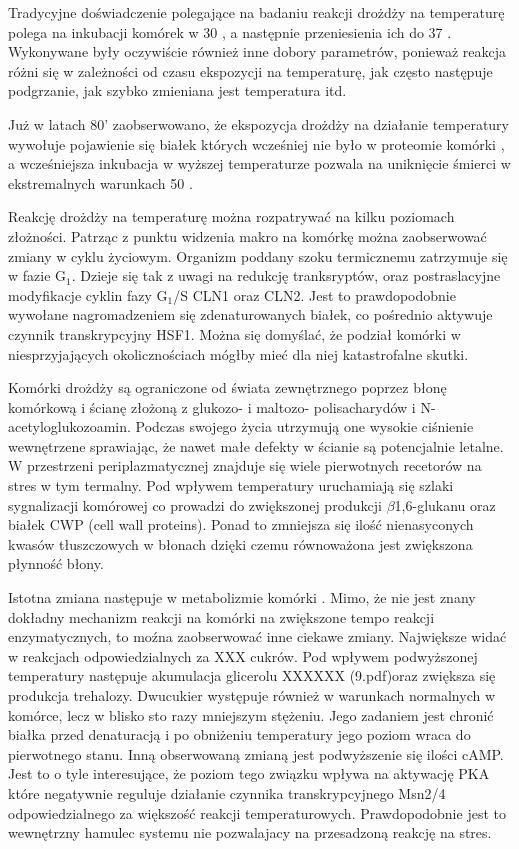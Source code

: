 \documentclass{pracamgr}
\begin{document}
Tradycyjne doświadczenie polegające na badaniu reakcji drożdży na temperaturę polega na inkubacji komórek w 30 \textcelsius, a
następnie przeniesienia ich do 37 \textcelsius. Wykonywane były oczywiście również inne dobory parametrów, ponieważ 
reakcja różni się w zależności od czasu ekspozycji na temperaturę, jak często następuje podgrzanie, jak szybko zmieniana
jest temperatura itd.

Już w latach 80' zaobserwowano, że ekspozycja drożdży na działanie temperatury wywołuje pojawienie się białek których 
wcześniej nie było w proteomie komórki \cite{Miller1979}, a wcześniejsza inkubacja w wyższej temperaturze pozwala 
na uniknięcie śmierci w ekstremalnych warunkach 50 \textcelsius \cite{Mcalister1980}.

Reakcję drożdży na temperaturę można rozpatrywać na kilku poziomach złożności. Patrząc z punktu widzenia makro na komórkę
można zaobserwować zmiany w cyklu życiowym. Organizm poddany szoku termicznemu zatrzymuje się w fazie G$_1$. Dzieje się tak 
z uwagi na redukcję tranksryptów, oraz postraslacyjne modyfikacje cyklin fazy G$_1$/S CLN1 oraz CLN2\cite{CyclinArrest}. Jest to prawdopodobnie
wywołane nagromadzeniem się zdenaturowanych białek, co pośrednio aktywuje czynnik transkrypcyjny HSF1\cite{MisfoldedProteins}. Można się domyślać, że 
podział komórki w niesprzyjających okolicznościach mógłby mieć dla niej katastrofalne skutki.	

Komórki drożdży są ograniczone od świata zewnętrznego poprzez błonę komórkową i ścianę złożoną z glukozo- i maltozo- polisacharydów
 i N-acetyloglukozoamin. Podczas swojego życia utrzymują one wysokie ciśnienie wewnętrzene sprawiając, że nawet małe defekty w ścianie 
 są potencjalnie letalne. W przestrzeni periplazmatycznej znajduje się wiele pierwotnych recetorów na stres w tym termalny. 
 Pod wpływem temperatury uruchamiają się szlaki sygnalizacji komórowej co prowadzi do zwiększonej produkcji $\beta$1,6-glukanu
 oraz białek CWP (cell wall proteins)\cite{CellWall}. Ponad to zmniejsza się ilość nienasyconych kwasów tłuszczowych w błonach \cite{CellLipids}
 dzięki czemu równoważona jest zwiększona płynność błony.
 
 Istotna zmiana następuje w metabolizmie komórki
 . Mimo, że nie jest znany dokładny mechanizm reakcji na komórki na zwiększone 
 tempo reakcji enzymatycznych, to moźna zaobserwować inne ciekawe zmiany. Największe widać w reakcjach odpowiedzialnych za
 XXX cukrów. Pod wpływem podwyższonej temperatury następuje akumulacja glicerolu \cite{GlycerolAccumulate} XXXXXX (9.pdf)oraz
 zwiększa się produkcja trehalozy. Dwucukier występuje również w warunkach normalnych w komórce, lecz w blisko sto razy mniejszym stężeniu. 
 Jego zadaniem jest chronić białka przed denaturacją i po obniżeniu temperatury jego poziom wraca do pierwotnego stanu. Inną obserwowaną
 zmianą jest podwyższenie się ilości cAMP. Jest to o tyle interesujące, że poziom tego związku wpływa na aktywację PKA które negatywnie
 reguluje działanie czynnika transkrypcyjnego Msn2/4 odpowiedzialnego za większość reakcji temperaturowych. Prawdopodobnie 
 jest to wewnętrzny hamulec systemu nie pozwalajacy na przesadzoną reakcję na stres\cite{Blomberg00,StressResponse99}.
\end{document}

